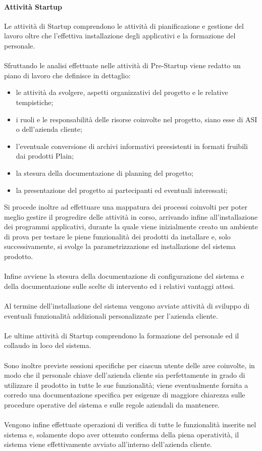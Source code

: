\paragraph{Attività Startup}
Le attività di Startup comprendono le attività di pianificazione e gestione del lavoro oltre che l'effettiva installazione degli applicativi e la formazione del personale.
\\\\
Sfruttando le analisi effettuate nelle attività di Pre-Startup viene redatto un piano di lavoro che definisce in dettaglio:
\begin{itemize}
	\item le attività da svolgere, aspetti organizzativi del progetto e le relative tempistiche;
	\item i ruoli e le responsabilità delle risorse coinvolte nel progetto, siano esse di ASI o dell'azienda cliente;
	\item l'eventuale conversione di archivi informativi preesistenti in formati fruibili dai prodotti Plain;
	\item la stesura della documentazione di planning del progetto;
	\item la presentazione del progetto ai partecipanti ed eventuali interessati;
\end{itemize}
Si procede inoltre ad effettuare una mappatura dei processi coinvolti per poter meglio gestire il progredire delle attività in corso, arrivando infine all'installazione dei programmi applicativi, durante la quale viene inizialmente creato un ambiente di prova per testare le piene funzionalità dei prodotti da installare e, solo successivamente, si svolge la parametrizzazione ed installazione del sistema prodotto.
\\\\
Infine avviene la stesura della documentazione di configurazione del sistema e della documentazione sulle scelte di intervento ed i relativi vantaggi attesi.
\\\\
Al termine dell'installazione del sistema vengono avviate attività di sviluppo di eventuali funzionalità addizionali personalizzate per l'azienda cliente.
\\\\
Le ultime attività di Startup comprendono la formazione del personale ed il collaudo in loco del sistema.
\\\\
Sono inoltre previste sessioni specifiche per ciascun utente delle aree coinvolte, in modo che il personale chiave dell'azienda cliente sia perfettamente in grado di utilizzare il prodotto in tutte le sue funzionalità; viene eventualmente fornita a corredo una documentazione specifica per esigenze di maggiore chiarezza sulle procedure operative del sistema e sulle regole aziendali da mantenere.
\\\\
Vengono infine effettuate operazioni di verifica di tutte le funzionalità inserite nel sistema e, solamente dopo aver ottenuto conferma della piena operatività, il sistema viene effettivamente avviato all'interno dell'azienda cliente.

